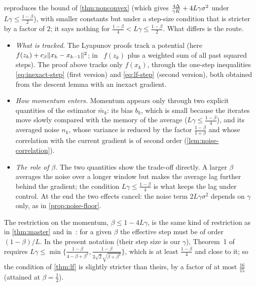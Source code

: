  reproduces the bound of \cref{thm:nonconvex} (which gives
$\frac{4\Delta}{\gamma K}+4L\gamma\sigma^2$ under $L\gamma\le\frac{1-\beta}{2}$), with smaller constants but under
a step-size condition that is stricter by a factor of $2$; it says nothing for
$\frac{1-\beta}{4}<L\gamma\le\frac{1-\beta}{2}$. What differs is the route.
\begin{itemize}
\item \emph{What is tracked.} The Lyapunov proofs track a potential (here
  $f(z_k)+c_\beta\lVert x_k-x_{k-1}\rVert^2$; in~\cite{liu2020} $f(z_k)$ plus a weighted sum of all
  past squared steps). The proof above tracks only $f(x_k)$, through the one-step
  inequalities \eqref{eq:inexact-step} (first version) and \eqref{eq:lf-step} (second
  version), both obtained from the descent lemma with an inexact gradient.
\item \emph{How momentum enters.} Momentum appears only through two explicit quantities of
  the estimator $\bar m_k$: its bias $b_k$, which is small because the iterates move slowly
  compared with the memory of the average ($L\gamma\le\frac{1-\beta}{4}$), and its averaged noise
  $n_k$, whose variance is reduced by the factor $\frac{1-\beta}{1+\beta}$ and whose correlation with
  the current gradient is of second order (\cref{lem:noise-correlation}).
\item \emph{The role of $\beta$.} The two quantities show the trade-off directly. A larger
  $\beta$ averages the noise over a longer window but makes the average lag further behind
  the gradient; the condition $L\gamma\le\frac{1-\beta}{4}$ is what keeps the lag under control.
  At the end the two effects cancel: the noise term $2L\gamma\sigma^2$ depends on $\gamma$ only,
  as in \cref{prop:noise-floor}.
\end{itemize}
The restriction on the momentum, $\beta\le1-4L\gamma$, is the same kind of restriction as in
\cref{thm:master} and in~\cite{liu2020}: for a given $\beta$ the effective step must be of
order $(1-\beta)/L$. In the present notation (their step size is our $\gamma$), Theorem~1
of~\cite{liu2020} requires
$L\gamma\le\min\bigl\{\frac{1-\beta}{4-\beta+\beta^2},\frac{1-\beta}{2\sqrt2\sqrt{\beta+\beta^2}}\bigr\}$, which is at
least $\frac{1-\beta}{4}$ and close to it; so the condition of \cref{thm:lf} is slightly stricter
than theirs, by a factor of at most $\frac{16}{15}$ (attained at $\beta=\frac12$).
